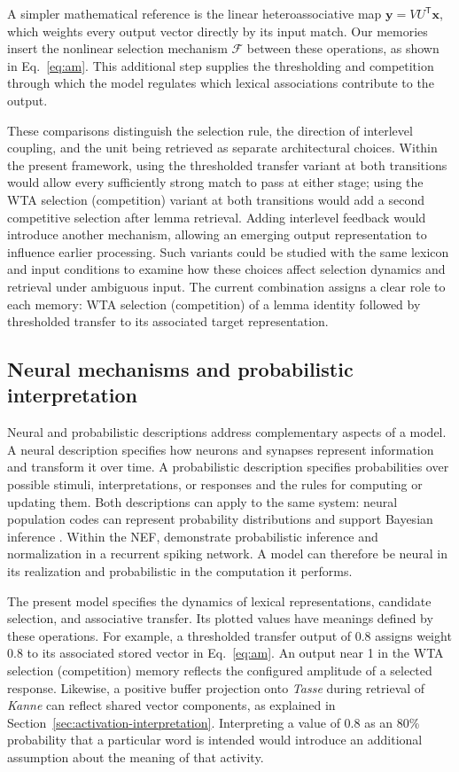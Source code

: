 A simpler mathematical reference is the linear heteroassociative map $\mathbf y=VU^{\mathsf T}\mathbf x$, which weights every output vector directly by its input match. Our memories insert the nonlinear selection mechanism $\mathcal F$ between these operations, as shown in Eq.~\eqref{eq:am}. This additional step supplies the thresholding and competition through which the model regulates which lexical associations contribute to the output.

These comparisons distinguish the selection rule, the direction of interlevel coupling, and the unit being retrieved as separate architectural choices. Within the present framework, using the thresholded transfer variant at both transitions would allow every sufficiently strong match to pass at either stage; using the WTA selection (competition) variant at both transitions would add a second competitive selection after lemma retrieval. Adding interlevel feedback would introduce another mechanism, allowing an emerging output representation to influence earlier processing. Such variants could be studied with the same lexicon and input conditions to examine how these choices affect selection dynamics and retrieval under ambiguous input. The current combination assigns a clear role to each memory: WTA selection (competition) of a lemma identity followed by thresholded transfer to its associated target representation.

\subsection{Neural mechanisms and probabilistic interpretation}
\label{sec:neural-probabilistic}
Neural and probabilistic descriptions address complementary aspects of a model. A neural description specifies how neurons and synapses represent information and transform it over time. A probabilistic description specifies probabilities over possible stimuli, interpretations, or responses and the rules for computing or updating them. Both descriptions can apply to the same system: neural population codes can represent probability distributions and support Bayesian inference \citep{ma2006}. Within the NEF, \citet{eliasmithmartens2011} demonstrate probabilistic inference and normalization in a recurrent spiking network. A model can therefore be neural in its realization and probabilistic in the computation it performs.

The present model specifies the dynamics of lexical representations, candidate selection, and associative transfer. Its plotted values have meanings defined by these operations. For example, a thresholded transfer output of 0.8 assigns weight 0.8 to its associated stored vector in Eq.~\eqref{eq:am}. An output near 1 in the WTA selection (competition) memory reflects the configured amplitude of a selected response. Likewise, a positive buffer projection onto \emph{Tasse} during retrieval of \emph{Kanne} can reflect shared vector components, as explained in Section~\ref{sec:activation-interpretation}. Interpreting a value of 0.8 as an 80\% probability that a particular word is intended would introduce an additional assumption about the meaning of that activity.

